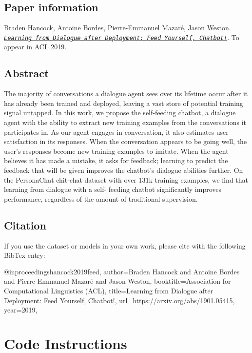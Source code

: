 \subsection*{Paper information}

Braden Hancock, Antoine Bordes, Pierre-\/\+Emmanuel Mazaré, Jason Weston. {\itshape \href{https://arxiv.org/abs/1901.05415}{\tt Learning from Dialogue after Deployment\+: Feed Yourself, Chatbot!}}. To appear in A\+CL 2019.

\subsection*{Abstract}

The majority of conversations a dialogue agent sees over its lifetime occur after it has already been trained and deployed, leaving a vast store of potential training signal untapped. In this work, we propose the self-\/feeding chatbot, a dialogue agent with the ability to extract new training examples from the conversations it participates in. As our agent engages in conversation, it also estimates user satisfaction in its responses. When the conversation appears to be going well, the user’s responses become new training examples to imitate. When the agent believes it has made a mistake, it asks for feedback; learning to predict the feedback that will be given improves the chatbot’s dialogue abilities further. On the Persona\+Chat chit-\/chat dataset with over 131k training examples, we find that learning from dialogue with a self-\/ feeding chatbot significantly improves performance, regardless of the amount of traditional supervision.

\subsection*{Citation}

If you use the dataset or models in your own work, please cite with the following Bib\+Tex entry\+: \begin{DoxyVerb}@inproceedings{hancock2019feed,
  author={Braden Hancock and Antoine Bordes and Pierre-Emmanuel Mazar\'{e} and Jason Weston},
  booktitle={Association for Computational Linguistics (ACL)},
  title={Learning from Dialogue after Deployment: Feed Yourself, Chatbot!},
  url={https://arxiv.org/abs/1901.05415},
  year={2019},
}
\end{DoxyVerb}


\section*{Code Instructions}

